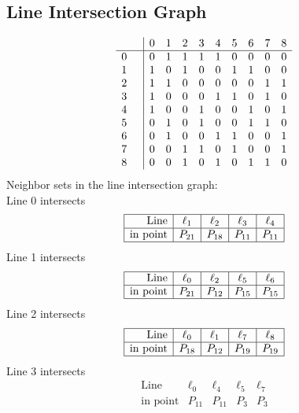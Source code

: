 \documentclass{article}
\begin{document}
{\subsection*{Line Intersection Graph}
{\arraycolsep=1pt
$$
\begin{array}{rr|*{9}r}
 &  & 0 & 1 & 2 & 3 & 4 & 5 & 6 & 7 & 8\\
\hline
0 &  & 0 & 1 & 1 & 1 & 1 & 0 & 0 & 0 & 0\\
1 &  & 1 & 0 & 1 & 0 & 0 & 1 & 1 & 0 & 0\\
2 &  & 1 & 1 & 0 & 0 & 0 & 0 & 0 & 1 & 1\\
3 &  & 1 & 0 & 0 & 0 & 1 & 1 & 0 & 1 & 0\\
4 &  & 1 & 0 & 0 & 1 & 0 & 0 & 1 & 0 & 1\\
5 &  & 0 & 1 & 0 & 1 & 0 & 0 & 1 & 1 & 0\\
6 &  & 0 & 1 & 0 & 0 & 1 & 1 & 0 & 0 & 1\\
7 &  & 0 & 0 & 1 & 1 & 0 & 1 & 0 & 0 & 1\\
8 &  & 0 & 0 & 1 & 0 & 1 & 0 & 1 & 1 & 0\\
\end{array}
$$
}%
Neighbor sets in the line intersection graph:\\
Line 0 intersects 
$$
\begin{array}{|r*{4}{|c}|}
\hline
\mbox{Line}  & \ell_{1} & \ell_{2} & \ell_{3} & \ell_{4}\\
\hline
\mbox{in point}  & P_{21} & P_{18} & P_{11} & P_{11}\\
\hline
\end{array}
$$
Line 1 intersects 
$$
\begin{array}{|r*{4}{|c}|}
\hline
\mbox{Line}  & \ell_{0} & \ell_{2} & \ell_{5} & \ell_{6}\\
\hline
\mbox{in point}  & P_{21} & P_{12} & P_{15} & P_{15}\\
\hline
\end{array}
$$
Line 2 intersects 
$$
\begin{array}{|r*{4}{|c}|}
\hline
\mbox{Line}  & \ell_{0} & \ell_{1} & \ell_{7} & \ell_{8}\\
\hline
\mbox{in point}  & P_{18} & P_{12} & P_{19} & P_{19}\\
\hline
\end{array}
$$
Line 3 intersects 
$$
\begin{array}{|r*{4}{|c}|}
\hline
\mbox{Line}  & \ell_{0} & \ell_{4} & \ell_{5} & \ell_{7}\\
\hline
\mbox{in point}  & P_{11} & P_{11} & P_{3} & P_{3}\\

\end{array}$$}
\end{document}

